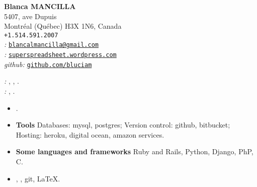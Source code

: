 \newcommand{\cvpar}[2]{\makebox[2.5cm][l]{#1}\parbox[t]{12.9cm}{#2}}
\newcommand{\cvref}[2]{\parbox[t]{6.8cm}{#1}\qquad\parbox[t]{8cm}{#2}}
\newcommand{\cvteach}[2]%
  {\makebox[2.4cm][r]{#1}\hspace*{1.1cm}\parbox[t]{11cm}{#2}}
\newcommand{\pp}[0]{{{\raise 2pt\hbox{\scriptsize+}}}}


\textbf{\large Blanca MANCILLA}\\

\vspace*{-0.4cm}%
5407, ave Dupuis\\
Montréal (Québec) H3X 1N6, Canada
\hfill
\href{https://ca.linkedin.com/in/blancalmancilla/}\\
\texttt{+1.514.591.2007}\\
{\it \wordEmail:}
\href{mailto:blancalmancilla@gmail.com}
{\texttt{\footnotesize blancalmancilla@gmail.com}}\\
{\it \wordBlog:} \href{https://superspreadsheet.wordpress.com}%
    {\tt{\footnotesize superspreadsheet.wordpress.com}}\\
{\it github:} \href{https://github.com/bluciam}%
    {\tt{\footnotesize github.com/bluciam}}

{\it \langskill:} \langEnglish, \langFrench, \langSpanish.\\
{\it \other:} \langGerman, \germanlevel.\\
\thispagestyle{empty}

\textbf{\large \profile}

\profiledesc

\vspace*{0.3cm}


\vspace*{0.3cm}
\textbf{\large \snapshot} 

\begin{itemize}
\item
\web.

\item
\textbf{Tools} Databases: mysql, postgres; Version control: github, bitbucket;
Hosting: heroku, digital ocean, amazon services.

\item
\textbf{Some languages and frameworks} Ruby and Rails, Python, Django, PhP, C.

\vspace*{-0.3cm}
\item
\open, \cli, git, \LaTeX.


\end{itemize}

